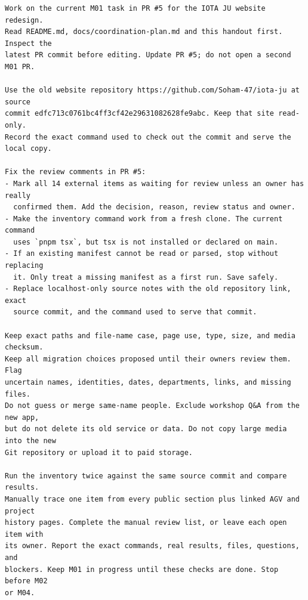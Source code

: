 \documentclass[11pt]{article}
\begin{document}
\begin{verbatim}
Work on the current M01 task in PR #5 for the IOTA JU website redesign.
Read README.md, docs/coordination-plan.md and this handout first. Inspect the
latest PR commit before editing. Update PR #5; do not open a second M01 PR.

Use the old website repository https://github.com/Soham-47/iota-ju at source
commit edfc713c0761bc4ff3cf42e29631082628fe9abc. Keep that site read-only.
Record the exact command used to check out the commit and serve the local copy.

Fix the review comments in PR #5:
- Mark all 14 external items as waiting for review unless an owner has really
  confirmed them. Add the decision, reason, review status and owner.
- Make the inventory command work from a fresh clone. The current command
  uses `pnpm tsx`, but tsx is not installed or declared on main.
- If an existing manifest cannot be read or parsed, stop without replacing
  it. Only treat a missing manifest as a first run. Save safely.
- Replace localhost-only source notes with the old repository link, exact
  source commit, and the command used to serve that commit.

Keep exact paths and file-name case, page use, type, size, and media checksum.
Keep all migration choices proposed until their owners review them. Flag
uncertain names, identities, dates, departments, links, and missing files.
Do not guess or merge same-name people. Exclude workshop Q&A from the new app,
but do not delete its old service or data. Do not copy large media into the new
Git repository or upload it to paid storage.

Run the inventory twice against the same source commit and compare results.
Manually trace one item from every public section plus linked AGV and project
history pages. Complete the manual review list, or leave each open item with
its owner. Report the exact commands, real results, files, questions, and
blockers. Keep M01 in progress until these checks are done. Stop before M02
or M04.
\end{verbatim}
\end{document}
